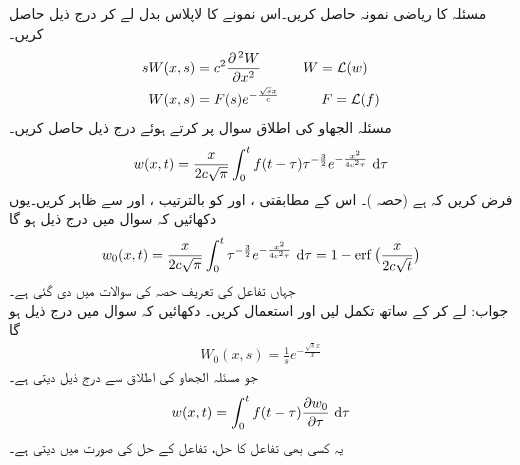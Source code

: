\quad
مسئلہ کا ریاضی نمونہ حاصل کریں۔اس نمونے کا لاپلاس بدل لے کر درج ذیل حاصل کریں۔
\begin{align*}
sW(x,s)&=c^2\frac{\partial^{\,2}W}{\partial x^2}\quad \quad \quad W=\mathcal{L}(w)\\
W(x,s)&=F(s)e^{-\frac{\sqrt{s}x}{c}}\quad \quad \quad F=\mathcal{L}(f)
\end{align*} 
\quad
مسئلہ الجھاو کی اطلاق سوال  پر کرتے ہوئے درج ذیل حاصل کریں۔
\begin{align*}
w(x,t)=\frac{x}{2c\sqrt{\pi}}\int_0^t f(t-\tau) \tau^{-\frac{3}{2}} e^{-\frac{x^2}{4c^2\tau}}\,\dif \tau
\end{align*}
\quad
فرض کریں کہ  ہے (حصہ )۔ اس کے مطابقتی ،  اور  کو بالترتیب ،  اور  سے ظاہر کریں۔یوں دکھائیں کہ سوال  میں درج ذیل ہو گا
\begin{align*}
w_0(x,t)=\frac{x}{2c\sqrt{\pi}}\int_0^t \tau^{-\frac{3}{2}}e^{-\frac{x^2}{4c^2\tau}}\,\dif \tau=1-\erf\big(\frac{x}{2c\sqrt{t}}\big)
\end{align*}
جہاں تفاعل  کی تعریف حصہ  کی سوالات میں دی گئی ہے۔\\
جواب:\quad
{} لے کر  کے ساتھ تکمل لیں اور  استعمال کریں۔
\quad
دکھائیں کہ سوال  میں درج ذیل ہو گا
\begin{align*}
W_0(x,s)=\frac{1}{s}e^{-\frac{\sqrt{s}x}{x}}
\end{align*}
جو مسئلہ الجھاو کی اطلاق سے درج ذیل دیتی ہے۔
\begin{align*}
w(x,t)=\int_0^t f(t-\tau)\frac{\partial w_0}{\partial \tau}\,\dif \tau
\end{align*}
یہ کسی بھی تفاعل   کا حل، تفاعل  کے حل  کی صورت میں دیتی ہے۔
